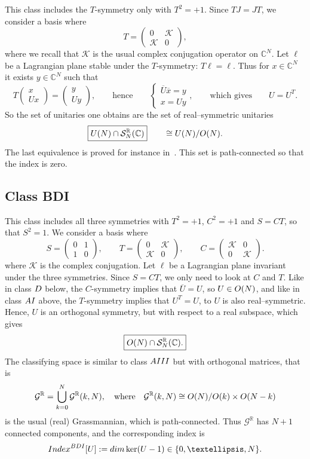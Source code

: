 \documentclass[11pt]{amsart}
\numberwithin{equation}{section} %
\newcommand\1{{\mathds 1}}
\def\C{{\mathbb C}}
\def\CC{{\mathbb C}}
\def\R{{\mathbb R}}
\def\RR{{\mathbb R}}
\def\cG{{\mathcal G}}
\def\cK{{\mathcal K}}
\def\cS{{\mathcal S}}
\def\rAIII{{\rm AIII}}
\def\rAI{{\rm AI}}
\def\rBDI{{\rm BDI}}
\def\rD{{\rm D}}
\def\U{{\rm U}}
\def\O{{\rm O}}
\def\Index{{\rm Index}}
\def\dim{{\rm dim }}
\begin{document}
This class includes the $T$-symmetry only with $T^2=+1$. Since $TJ=JT$, we consider a basis where 
$$
T = \begin{pmatrix}
	0 & \cK \\
	\cK & 0
\end{pmatrix},
$$
where we recall that $\cK$ is the usual complex conjugation operator on $\C^N$.  Let $\ell$ be a Lagrangian plane stable under the $T$-symmetry: $T\ell=\ell$. Thus for $x \in \CC^N$ it exists $y \in \CC^N$ such that 
$$
T \begin{pmatrix}	x  \\	U x \end{pmatrix} = 
\begin{pmatrix}	y  \\	U y \end{pmatrix}, \qquad \text{hence} \qquad
\begin{cases}
    \overline{U} \overline{x} = y \\
    x = U y
\end{cases}, \qquad \text{which gives} \qquad
 U = U^T.
$$
So the set of unitaries one obtains are the set of real--symmetric unitaries
\[
    \boxed{ \U(N) \cap \cS_N^\R(\C)} \qquad  \cong \U(N)/\O(N).
\]
The last equivalence is proved for instance in~\cite[Corollary A.2]{GonMonPer-22}. This set is path-connected so that the index is zero.

\subsection{Class BDI}
\label{sec:class_BDI}

This class includes all three symmetries with $T^2=+1$, $C^2=+1$ and $S=CT$, so that $S^2=1$. We consider a basis where
$$
S = \begin{pmatrix} 0 & 1 \\ 1 & 0 \end{pmatrix}, \qquad 
T = \begin{pmatrix} 0 & \cK \\ \cK & 0 \end{pmatrix} , \qquad 
C=\begin{pmatrix} \cK & 0 \\ 0 & \cK \end{pmatrix}.
$$
where $\cK$ is the complex conjugation. Let $\ell$ be a Lagrangian plane invariant under the three symmetries. Since $S=CT$, we only need to look at $C$ and $T$. Like in class $\rD$ below, the $C$-symmetry implies that $\overline{U}=U$, so $U \in \O(N)$, and like in class $\rAI$ above, the $T$-symmetry implies that $U^T=U$, to $U$ is also real--symmetric. Hence, $U$ is an orthogonal symmetry, but with respect to a real subspace, which gives
\[
    \boxed{ \O(N) \cap \cS_N^\R(\C) .}
\]
The classifying space is similar to class $\rAIII$ but with orthogonal matrices, that is
$$
    \cG^\RR = \mathop{\bigcup}_{k=0}^N \cG^\RR(k,N), \quad \text{where} \quad
    \cG^\RR(k,N) \cong \O(N) / \O(k) \times \O(N-k)
$$
is the usual (real) Grassmannian, which is path-connected. Thus $\cG^\RR$ has $N+1$ connected components, and the corresponding index is 
$$
\Index^{\rBDI}[U] := \dim \ker(U-1) \in \{0,\ldots, N\}.$$
\end{document}
